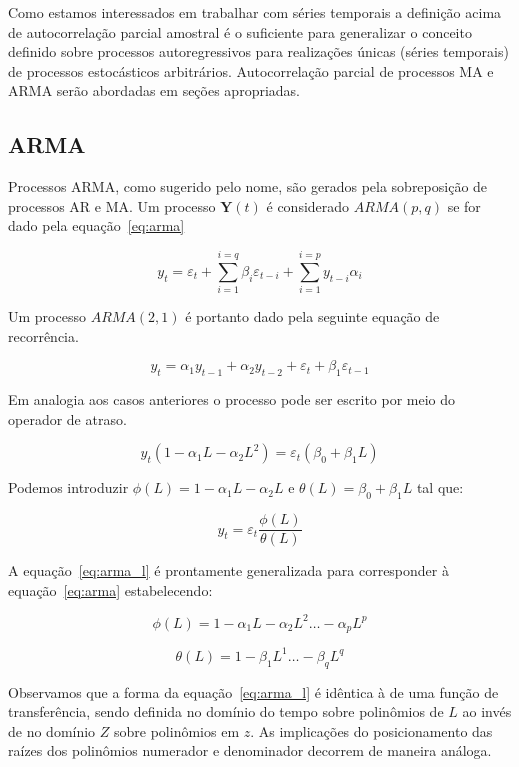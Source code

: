 Como estamos interessados em trabalhar com séries temporais a definição acima
de autocorrelação parcial amostral é o suficiente para generalizar o conceito
definido sobre processos autoregressivos para realizações únicas (séries
temporais) de processos estocásticos arbitrários. Autocorrelação parcial
de processos MA e ARMA serão abordadas em seções apropriadas.

\subsection{ARMA}
\label{ssec:ARMA}

Processos ARMA, como sugerido pelo nome, são gerados pela sobreposição de
processos AR e MA. Um processo ${\mathbf{Y}}(t)$ é considerado $ARMA(p, q)$ se
for dado pela equação~\ref{eq:arma}

\begin{equation}\label{eq:arma}
    y_t = \varepsilon_t + \sum_{i=1}^{i=q} \beta_i \varepsilon_{t-i} + \sum_{i=1}^{i=p} y_{t-i}\alpha_i
\end{equation}

Um processo $ARMA(2, 1)$ é portanto dado pela seguinte equação de recorrência.

$$ y_t = \alpha_1 y_{t-1} + \alpha_2 y_{t-2} + \varepsilon_{t} + \beta_1 \varepsilon_{t-1} $$

Em analogia aos casos anteriores o processo pode ser escrito por meio do
operador de atraso.

$$ y_t (1 - \alpha_1 L - \alpha_2 L^2) = \varepsilon_{t} (\beta_0 + \beta_1 L) $$

Podemos introduzir $\phi(L) = 1 - \alpha_1 L - \alpha_2 L$ e $\theta(L) =
\beta_0 + \beta_1 L$ tal que:

\begin{equation}\label{eq:arma_l}
    y_t = \varepsilon_t \frac{\phi(L)}{\theta(L)}
\end{equation}

A equação~\ref{eq:arma_l} é prontamente generalizada para corresponder à
equação~\ref{eq:arma} estabelecendo:

$$\phi(L) = 1 - \alpha_1 L - \alpha_2 L^2 \hdots - \alpha_p L^p$$

$$\theta(L) = 1 - \beta_1 L^1 \hdots - \beta_q L^q$$


Observamos que a forma da equação~\ref{eq:arma_l} é idêntica à de uma função de
transferência, sendo definida no domínio do tempo sobre polinômios de $L$ ao
invés de no domínio $Z$ sobre polinômios em $z$. As implicações do
posicionamento das raízes dos polinômios numerador e denominador decorrem de
maneira análoga.

